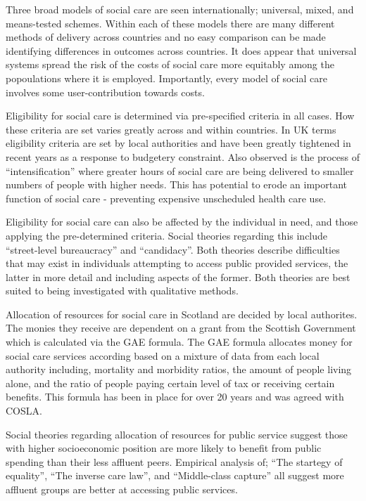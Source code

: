 \documentclass[12pt,]{report}
\begin{document}
Three broad models of social care are seen internationally; universal,
mixed, and means-tested schemes. Within each of these models there are
many different methods of delivery across countries and no easy
comparison can be made identifying differences in outcomes across
countries. It does appear that universal systems spread the risk of the
costs of social care more equitably among the popoulations where it is
employed. Importantly, every model of social care involves some
user-contribution towards costs.

Eligibility for social care is determined via pre-specified criteria in
all cases. How these criteria are set varies greatly across and within
countries. In UK terms eligibility criteria are set by local authorities
and have been greatly tightened in recent years as a response to
budgetery constraint. Also observed is the process of
``intensification'' where greater hours of social care are being
delivered to smaller numbers of people with higher needs. This has
potential to erode an important function of social care - preventing
expensive unscheduled health care use.

Eligibility for social care can also be affected by the individual in
need, and those applying the pre-determined criteria. Social theories
regarding this include ``street-level bureaucracy'' and ``candidacy''.
Both theories describe difficulties that may exist in individuals
attempting to access public provided services, the latter in more detail
and including aspects of the former. Both theories are best suited to
being investigated with qualitative methods.

Allocation of resources for social care in Scotland are decided by local
authorites. The monies they receive are dependent on a grant from the
Scottish Government which is calculated via the GAE formula. The GAE
formula allocates money for social care services according based on a
mixture of data from each local authority including, mortality and
morbidity ratios, the amount of people living alone, and the ratio of
people paying certain level of tax or receiving certain benefits. This
formula has been in place for over 20 years and was agreed with COSLA.

Social theories regarding allocation of resources for public service
suggest those with higher socioeconomic position are more likely to
benefit from public spending than their less affluent peers. Empirical
analysis of; ``The startegy of equality'', ``The inverse care law'', and
``Middle-class capture'' all suggest more affluent groups are better at
accessing public services.
\end{document}
